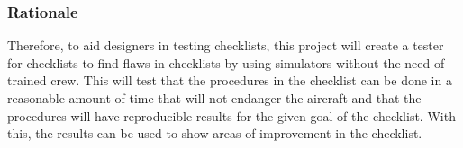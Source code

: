 \documentclass[a4paper, british]{article}
\newcommand{\lfcomment}[1]{\textcolor{blue}{\textbf{LF}:~#1}}
\renewcommand{\lfcomment}[1]{\relax}
\begin{document}
\subsubsection*{Rationale}

Therefore, to aid designers in testing checklists, this project 
will create a tester for checklists to find flaws in checklists 
by using simulators without the need of trained crew. This will 
test that the procedures in the checklist can be done in a reasonable
amount of time that will not endanger the aircraft and that the procedures 
will have reproducible results for the given goal of the checklist.
With this, the results can be used to show areas of improvement in 
the checklist.

\lfcomment{On CL book, Ch1 is about nature of where CL work best; Ch2 explains what a CL is and isn't; Ch3 you can ignore, it talks about checklist for unknown/unexpected scenarios (advanced CL) in building; Ch4 he discussed CL with chefs; Ch5 talks about CL failures and why; \textbf{Ch6 is about Boeing's CL ``factory''}; Ch7 and 8 are about applying the CL he came up with, here you get the examples of test/baseline criteria for CL; Ch9 he explains it in his own practice (this is daunting read)!.}
\end{document}
